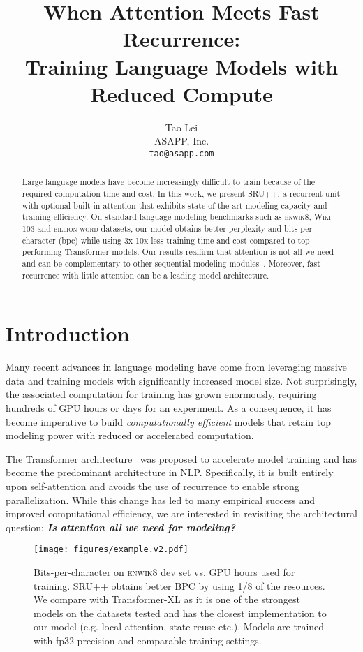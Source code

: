 \documentclass[11pt,a4paper]{article}
\title{When Attention Meets Fast Recurrence:\\Training Language Models with Reduced Compute}
\author{
Tao Lei\\
ASAPP, Inc.\\
{\tt tao@asapp.com}\\
}
\date{}
\begin{document}
\maketitle


\begin{abstract}
Large language models have become increasingly difficult to train because of the required computation time and cost.
In this work, we present SRU++, a recurrent unit with optional built-in attention that exhibits state-of-the-art modeling capacity and training efficiency. 
On standard language modeling benchmarks such as \textsc{enwik8}, \textsc{Wiki-103} and \textsc{billion word} datasets, our model obtains better perplexity and bits-per-character (bpc) while using 3x-10x less training time and cost compared to top-performing Transformer models.
Our results reaffirm that attention is not all we need and can be complementary to other sequential modeling modules~\cite{merity2019single,gulati2020}.
Moreover, fast recurrence with little attention can be a leading model architecture.
\end{abstract} \section{Introduction}
\label{sec:intro}


Many recent advances in language modeling have come from leveraging massive data and training models with significantly increased model size.
Not surprisingly, the associated computation for training has grown enormously, requiring hundreds of GPU hours or days for an experiment.
As a consequence, it has become imperative to build \emph{computationally efficient} models that retain top modeling power with reduced or accelerated computation.


The Transformer architecture~\cite{vaswani2017attention} was proposed to accelerate model training and has become the predominant architecture in NLP.
Specifically, it is built entirely upon self-attention and avoids the use of recurrence to enable strong parallelization.
While this change has led to many empirical success and improved computational efficiency, we are interested in revisiting the architectural question:
\emph{\bf Is attention all we need for modeling?}

\begin{figure}[t]
\texttt{[image: figures/example.v2.pdf]}
\caption{Bits-per-character on \textsc{enwik8} dev set vs. GPU hours used for training. SRU++ obtains better BPC by using 1/8 of the resources. 
We compare with Transformer-XL as it is one of the strongest models on the datasets tested and has the closest implementation to our model (e.g. local attention, state reuse etc.).
Models are trained with fp32 precision and comparable training settings.
}
\label{fig:intro}
\end{figure}
\end{document}
